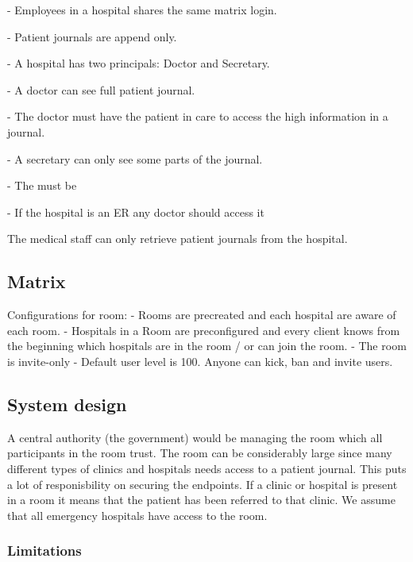 - Employees in a hospital shares the same matrix login.

- Patient journals are append only.


- A hospital has two principals: Doctor and Secretary.

- A doctor can see full patient journal.

- The doctor must have the patient in care to access the high information in a journal.

- A secretary can only see some parts of the journal.

- The must be 

- If the hospital is an ER any doctor should access it 


The medical staff can only retrieve patient journals from the hospital.





\subsection{Matrix}




Configurations for room:
- Rooms are precreated and each hospital are aware of each room. 
- Hospitals in a Room are preconfigured and every client knows from the beginning which hospitals are in the room / or can join the room.
- The room is invite-only
- Default user level is 100. Anyone can kick, ban and invite users. 



\subsection{System design}

A central authority (the government) would be managing the room which all participants in the room trust. The room can be considerably large since many different types of clinics and hospitals needs access to a patient journal. This puts a lot of responisbility on securing the endpoints. If a clinic or hospital is present in a room it means that the patient has been referred to that clinic. We assume that all emergency hospitals have access to the room.


\subsubsection{Limitations}

